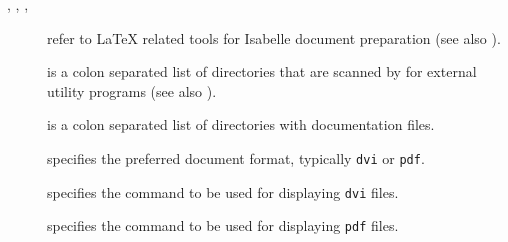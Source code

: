 \begin{isabellebody}
\begin{isamarkuptext}
\begin{description}
  \item[\hypertarget{setting.ISABELLE-LATEX}{\hyperlink{setting.ISABELLE-LATEX}{\mbox{}}}, \hypertarget{setting.ISABELLE-PDFLATEX}{\hyperlink{setting.ISABELLE-PDFLATEX}{\mbox{}}}, \hypertarget{setting.ISABELLE-BIBTEX}{\hyperlink{setting.ISABELLE-BIBTEX}{\mbox{}}}, \hypertarget{setting.ISABELLE-DVIPS}{\hyperlink{setting.ISABELLE-DVIPS}{\mbox{}}}] refer to {\LaTeX} related tools for Isabelle
  document preparation (see also ).
  
  \item[\hypertarget{setting.ISABELLE-TOOLS}{\hyperlink{setting.ISABELLE-TOOLS}{\mbox{}}}] is a colon separated list of
  directories that are scanned by \hyperlink{executable.isatool}{\mbox{}} for external
  utility programs (see also ).
  
  \item[\hypertarget{setting.ISABELLE-DOCS}{\hyperlink{setting.ISABELLE-DOCS}{\mbox{}}}] is a colon separated list of
  directories with documentation files.
  
  \item[\hypertarget{setting.ISABELLE-DOC-FORMAT}{\hyperlink{setting.ISABELLE-DOC-FORMAT}{\mbox{}}}] specifies the preferred
  document format, typically \verb|dvi| or \verb|pdf|.
  
  \item[\hypertarget{setting.DVI-VIEWER}{\hyperlink{setting.DVI-VIEWER}{\mbox{}}}] specifies the command to be used
  for displaying \verb|dvi| files.
  
  \item[\hypertarget{setting.PDF-VIEWER}{\hyperlink{setting.PDF-VIEWER}{\mbox{}}}] specifies the command to be used
  for displaying \verb|pdf| files.
  

\end{description}
\end{isamarkuptext}
\end{isabellebody}
